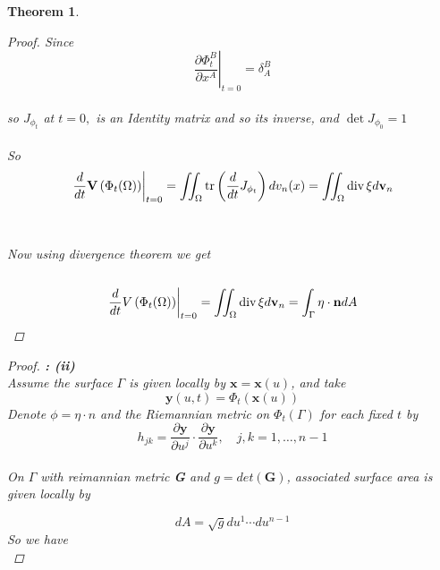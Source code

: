 \documentclass[oneside]{book}
\newtheorem{theorem}{Theorem}[section]
\begin{document}
\begin{theorem}
\begin{proof}
			Since \\
			$$\left.\frac{\partial \Phi_{t}^{B}}{\partial x^{A}}\right|_{t=0}=\delta_{A}^{B} $$
			\\
			so  $J_{\phi_{t}} $ at $t = 0,$ is an Identity matrix and so its inverse, and  $\operatorname{det} J_{\phi_{0}} = 1$\\\\
			So \\
			\begin{equation}
			\label{eq28}
			\left.\frac{d}{d t} \mathbf{V}\left(\Phi_{t}(\Omega)\right)\right|_{t=0} = \iint_{\Omega}\operatorname{tr}\left(\frac{d}{d t} J_{\phi_{t}}\right) d v_{n}(x) = \iint_{\Omega} \operatorname{div} \xi d \mathbf{v}_{n} \\\\
			\end{equation} \\\\
			Now using divergence theorem we get \\\\
			\begin{equation}
			\label{eq29}
			\left.\frac{d}{d t} V\left(\Phi_{t}(\Omega)\right)\right|_{t=0}=\iint_{\Omega} \operatorname{div} \xi d \mathbf{v}_{n}=\int_{\Gamma} \eta \cdot \mathbf{n} d A \\\\
			\end{equation}
			
			
			
		\end{proof}
		\begin{proof}
			
			
			\textbf{: (ii)} 
			\\
			Assume the surface $\Gamma$ is given locally by $\mathbf{x}=\mathbf{x}(u)$, and take \\
			$$
			\mathbf{y}(u, t)=\Phi_{t}(\mathbf{x}(u))
			$$
			Denote $\phi = \eta\cdot{n}$ and the Riemannian metric on $\Phi_{t}(\Gamma)$ for each fixed $t$ by 
			\begin{equation}
			\label{eq30}
			h_{j k}=\frac{\partial \mathbf{y}}{\partial u^{j}} \cdot \frac{\partial \mathbf{y}}{\partial u^{k}}, \quad j, k=1, \ldots, n-1
			\end{equation} \\
			On $\Gamma$ with reimannian metric \textbf{G} and  $g=det(\textbf{G})$, associated surface area is given locally by 
			
			\begin{equation}
			\label{eq31}
			d A=\sqrt{g} d u^{1} \cdots d u^{n-1}
			\end{equation} 
			So we have \\
			

\end{proof}
\end{theorem}
\end{document}
